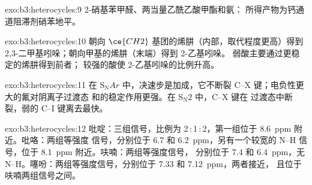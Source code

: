 \begin{solution}{exo:b3:heterocycles:9}
2-硝基苯甲醛、两当量乙酰乙酸甲酯和氨：
所得产物为钙通道阻滞剂硝苯地平。
\end{solution}

\begin{solution}{exo:b3:heterocycles:10}
朝向 $\ce{CH2}$ 基团的烯肼（内部，取代程度更高）得到
2,3-二甲基吲哚；朝向甲基的烯肼（末端）得到 2-乙基吲哚。
弱酸主要通过更稳定的烯肼得到前者；
较强的酸使 2-乙基吲哚的比例升高。
\end{solution}

\begin{solution}{exo:b3:heterocycles:11}
在 $\mathrm S_\mathrm NAr$ 中，决速步是加成，它不断裂 C--X
键；电负性更大的氟对阴离子过渡态
和的稳定作用更强。在 $\mathrm S_\mathrm N2$ 中，C--X 键在
过渡态中断裂，弱的 C--I 键离去最快。
\end{solution}

\begin{solution}{exo:b3:heterocycles:12}
吡啶：三组信号，比例为 2\,:\,1\,:\,2，第一组位于 \qty{8.6}{ppm} 附近。吡咯：两组等强度
信号，分别位于 6.7 和 \qty{6.2}{ppm}，另有一个较宽的 N--H 信号，位于 \qty{8.1}{ppm} 附近。呋喃：两组等强度信号，
分别位于 7.4 和 \qty{6.4}{ppm}，无 N--H。噻吩：两组等强度信号，分别位于 7.33 和 \qty{7.12}{ppm}，两者接近，
且位于呋喃两组信号之间。
\end{solution}

